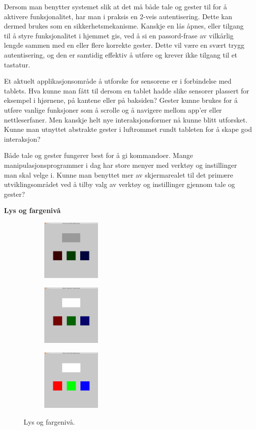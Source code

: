 Dersom man benytter systemet slik at det må både tale og gester til for å aktivere funksjonalitet, har man i praksis en 2-veis autentisering. Dette kan dermed brukes som en sikkerhetsmekanisme. Kanskje en lås åpnes, eller tilgang til å styre funksjonalitet i hjemmet gis, ved å si en passord-frase av vilkårlig lengde sammen med en eller flere korrekte gester. Dette vil være en svært trygg autentisering, og den er samtidig effektiv å utføre og krever ikke tilgang til et tastatur.

Et aktuelt applikasjonsområde å utforske for sensorene er i forbindelse med tablets. Hva kunne man fått til dersom en tablet hadde slike sensorer plassert for eksempel i hjørnene, på kantene eller på baksiden? Gester kunne brukes for å utføre vanlige funksjoner som å scrolle og å navigere mellom app'er eller nettleserfaner. Men kanskje helt nye interaksjonsformer nå kunne blitt utforsket. Kunne man utnyttet abstrakte gester i luftrommet rundt tableten for å skape god interaksjon?

Både tale og gester fungerer best for å gi kommandoer. Mange manipulasjonsprogrammer i dag har store menyer med verktøy og instillinger man skal velge i. Kunne man benyttet mer av skjermarealet til det primære utviklingsområdet ved å tilby valg av verktøy og instillinger gjennom tale og gester?

\textbf{Lys og fargenivå}\newline
\begin{figure}[h]
\centering
\begin{subfigure}{0.23\textwidth}
\includegraphics[width=3cm, height=3cm]{fig/color-1}
\caption{}
\label{fig:color-1}
\end{subfigure}
\begin{subfigure}{0.23\textwidth}
\includegraphics[width=3cm, height=3cm]{fig/color-2}
\caption{}
\label{fig:color-2}
\end{subfigure}
\begin{subfigure}{0.23\textwidth}
\includegraphics[width=3cm, height=3cm]{fig/color-3}
\caption{}
\label{fig:color-3}
\end{subfigure}
\caption{Lys og fargenivå.}
\label{fig:color}
\end{figure}

